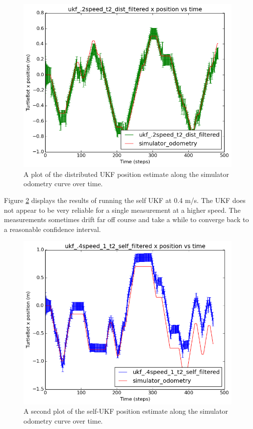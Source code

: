 \documentclass[conference]{IEEEtran} \usepackage[T1]{fontenc} \usepackage[backend=biber, style=ieee]{biblatex}
\begin{document}
\begin{figure}
\centering 
\includegraphics[scale=.45]{ukf_2speed_t2_dist_filtered_pos_err_graph}
\caption {A plot of the distributed UKF position estimate along the simulator odometry curve over time.}
\label{pic10} 
\end{figure}


Figure \ref{pic11} displays the results of running the self UKF at 0.4 m/s. The UKF does not 
appear to be very reliable for a single measurement at a higher speed. The measurements 
sometimes drift far off course and take a while to converge back to a reasonable 
confidence interval.

\begin{figure}
\centering 
\includegraphics[scale=.45]{ukf_4speed_1_t2_self_filtered_pos_err_graph}
\caption {A second plot of the self-UKF position estimate along the simulator 
odometry curve over time.}
\label{pic11} 
\end{figure}
\end{document}
